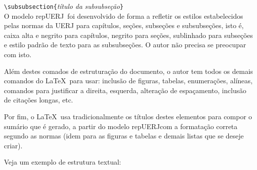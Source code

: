 \documentclass[a4paper,12pt,oneside,onecolumn]{article}
\newcommand{\comando}[1]{\texttt{\textbackslash #1}}
\newcommand{\param}[1]{\texttt{\{}\textsl{#1}\texttt{\}}}
\newcommand{\repUERJ}{\textsf{repUERJ}}
\begin{document}
\comando{subsubsection}\param{título da subsubseção}\\

O modelo \repUERJ\ foi desenvolvido de forma a refletir os estilos estabelecidos pelas normas da UERJ para capítulos, seções, subseções e subsubseções, isto é, caixa alta e negrito para capítulos, negrito para seções, sublinhado para subseções e estilo padrão de texto para as subsubseções. O autor não precisa se preocupar com isto.

Além destes comados de estruturação do documento, o autor tem todos os demais comandos do \LaTeX\ para usar: inclusão de figuras, tabelas, enumerações, alíneas, comandos para justificar a direita, esquerda, alteração de espaçamento, inclusão de citações longas, etc.

Por fim, o \LaTeX\ usa tradicionalmente os títulos destes elementos para compor o sumário que é gerado, a partir do modelo \repUERJ com a formatação correta segundo as normas (idem para as figuras e tabelas e demais listas que se deseje criar).

Veja um exemplo de estrutura textual:\\
\end{document}
